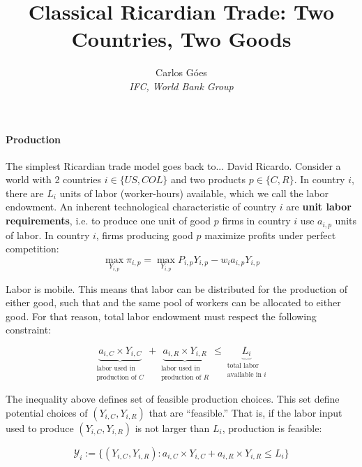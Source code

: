 \documentclass[11pt,letterpaper]{article}
\begin{document}
\title{\textbf{Classical Ricardian Trade: Two Countries, Two Goods}}
\author{\large%
\setcounter{footnote}{0}%
Carlos G\'{o}es \\[-3pt] \textit{\small IFC, World Bank Group}
}
\maketitle

\paragraph{Production} The simplest Ricardian trade model goes back to... David Ricardo. Consider a world with 2 countries $i \in \{ US, COL\}$ and two products $p \in \{ C, R\}$. In country $i$, there are $L_i$ units of labor (worker-hours) available, which we call the labor endowment. An inherent technological characteristic of country $i$ are \textbf{unit labor requirements}, i.e. to produce one unit of good $p$ firms in country $i$ use $a_{i,p}$ units of labor. In country $i$, firms producing good $p$ maximize profits under perfect competition:
        \begin{equation}\label{eq: production}
            \max_{Y_{i,p}} \pi_{i,p} = \max_{Y_{i,p}} P_{i,p}Y_{i,p} - w_i a_{i,p} Y_{i,p} 
        \end{equation}

Labor is mobile. This means that labor can be distributed for the production of either good, such that and the same pool of workers can be allocated to either good. For that reason, total labor endowment must respect the following constraint:

\begin{equation}\label{eq: ppf-inequality}
    \underbrace{a_{i,C} \times Y_{i,C}}_{\substack{\text{labor used in} \\ \text{production of } C}} + \underbrace{a_{i,R} \times Y_{i,R}}_{\substack{\text{labor used in} \\ \text{production of } R}} \le \underbrace{L_i}_{\substack{\text{total labor} \\ \text{available in } i}}
\end{equation}

The inequality above defines set of feasible production choices. This set define potential choices of $(Y_{i,C}, Y_{i,R})$ that are ``feasible.'' That is, if the labor input used to produce $(Y_{i,C}, Y_{i,R})$ is not larger than $L_i$, production is feasible:

        \begin{equation*}
            \mathcal{Y}_{i} := \{ (Y_{i,C}, Y_{i,R}) : a_{i,C} \times Y_{i,C} + a_{i,R} \times Y_{i,R} \le L_i \}
        \end{equation*}
\end{document}
